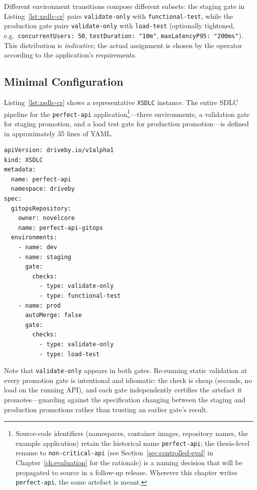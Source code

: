 Different environment transitions compose different subsets: the staging gate in Listing~\ref{lst:xsdlc-cr} pairs \texttt{validate-only} with \texttt{functional-test}, while the production gate pairs \texttt{validate-only} with \texttt{load-test} (optionally tightened, e.g.\ \texttt{concurrentUsers: 50}, \texttt{testDuration: "10m"}, \texttt{maxLatencyP95: "200ms"}). This distribution is \textit{indicative}; the actual assignment is chosen by the operator according to the application's requirements.

\subsection{Minimal Configuration}
\label{subsec:minimal-config}

Listing~\ref{lst:xsdlc-cr} shows a representative \texttt{XSDLC} instance. The entire SDLC pipeline for the \texttt{perfect-api} application\footnote{Source-code identifiers (namespaces, container images, repository names, the example application) retain the historical name \texttt{perfect-api}; the thesis-level rename to \texttt{non-critical-api} (see Section~\ref{sec:controlled-eval} in Chapter~\ref{ch:evaluation} for the rationale) is a naming decision that will be propagated to source in a follow-up release. Wherever this chapter writes \texttt{perfect-api}, the same artefact is meant.}---three environments, a validation gate for staging promotion, and a load test gate for production promotion---is defined in approximately 35 lines of YAML.

\begin{lstlisting}[caption={XSDLC custom resource defining a three-environment pipeline with quality gates.},label={lst:xsdlc-cr}]
apiVersion: driveby.io/v1alpha1
kind: XSDLC
metadata:
  name: perfect-api
  namespace: driveby
spec:
  gitopsRepository:
    owner: novelcore
    name: perfect-api-gitops
  environments:
    - name: dev
    - name: staging
      gate:
        checks:
          - type: validate-only
          - type: functional-test
    - name: prod
      autoMerge: false
      gate:
        checks:
          - type: validate-only
          - type: load-test
\end{lstlisting}

Note that \texttt{validate-only} appears in both gates. Re-running static validation at every promotion gate is intentional and idiomatic: the check is cheap (seconds, no load on the running API), and each gate independently certifies the artefact it promotes---guarding against the specification changing between the staging and production promotions rather than trusting an earlier gate's result.

